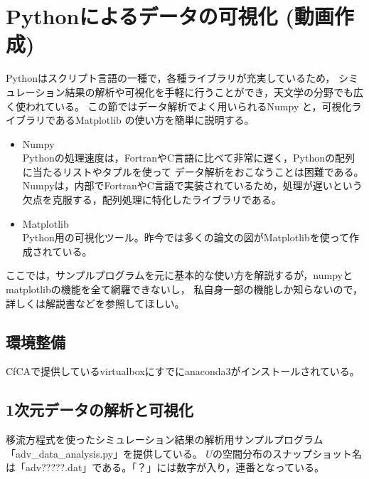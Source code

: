 \chapter{ Pythonによるデータの可視化 (動画作成)}


Pythonはスクリプト言語の一種で，各種ライブラリが充実しているため，
シミュレーション結果の解析や可視化を手軽に行うことができ，天文学の分野でも広く使われている。
この節ではデータ解析でよく用いられる{\ttfamily Numpy} \citep{Numpy}と，可視化ライブラリである{\ttfamily Matplotlib} \citep{Matplotlib}
の使い方を簡単に説明する。

\begin{itemize}
    \item {\ttfamily Numpy} \\
        Pythonの処理速度は，FortranやC言語に比べて非常に遅く，Pythonの配列に当たるリストやタプルを使って
データ解析をおこなうことは困難である。
{\ttfamily Numpy}は，内部でFortranやC言語で実装されているため，処理が遅いという欠点を克服する，配列処理に特化したライブラリである。

\item {\ttfamily Matplotlib} \\
    Python用の可視化ツール。昨今では多くの論文の図が{\ttfamily Matplotlib}を使って作成されている。
\end{itemize}

ここでは，サンプルプログラムを元に基本的な使い方を解説するが，{\ttfamily numpy}と{\ttfamily matplotlib}の機能を全て網羅できないし，
私自身一部の機能しか知らないので，詳しくは解説書などを参照してほしい。


\section{環境整備}

CfCAで提供している{\ttfamily virtualbox}にすでに{\ttfamily anaconda3}がインストールされている。

\section{1次元データの解析と可視化}

移流方程式を使ったシミュレーション結果の解析用サンプルプログラム「{\ttfamily adv\_data\_analysis.py}」を提供している。
$U$の空間分布のスナップショット名は「{\ttfamily adv?????.dat}」である。「？」には数字が入り，連番となっている。

